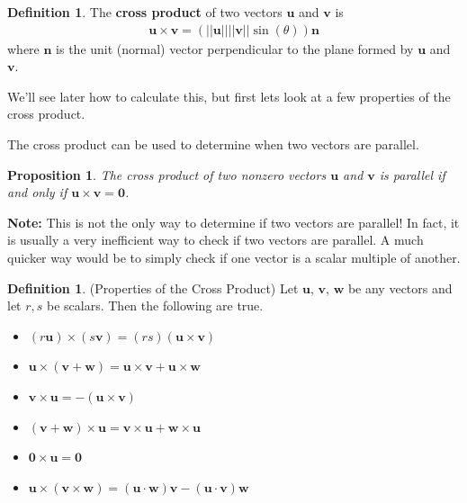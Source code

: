 \documentclass[12pt, letter]{article}
\theoremstyle{plain}
\newtheorem{proposition}[theorem]{Proposition}
\numberwithin{theorem}{section}
\theoremstyle{definition}
\newtheorem{definition}[theorem]{Definition}
\begin{document}
\bigskip

\begin{definition}
The \textbf{cross product} of two vectors $\bm{u}$ and $\bm{v}$ is
\begin{align*}
\bm{u} \times \bm{v} = (||\bm{u}|| ||\bm{v}|| \sin(\theta)) \bm{n}
\end{align*}
where $\bm{n}$ is the unit (normal) vector perpendicular to the plane formed by $\bm{u}$ and $\bm{v}$.
\end{definition}

\bigskip

We'll see later how to calculate this, but first lets look at a few properties of the cross product.

\bigskip

\hrulefill

\bigskip

The cross product can be used to determine when two vectors are parallel. 

\begin{proposition}
The cross product of two nonzero vectors $\bm{u}$ and $\bm{v}$ is parallel if and only if $\bm{u} \times \bm{v} = \bm{0}$.
\end{proposition}

\bigskip

\textbf{Note:} This is not the only way to determine if two vectors are parallel! In fact, it is usually a very inefficient way to check if two vectors are parallel. A much quicker way would be to simply check if one vector is a scalar multiple of another.

\bigskip

\hrulefill

\bigskip

\begin{definition}{(Properties of the Cross Product)}
Let $\bm{u}$, $\bm{v}$, $\bm{w}$ be any vectors and let $r, s$ be scalars. Then the following are true.
\begin{itemize}
\item $(r\bm{u}) \times (s\bm{v}) = (rs)(\bm{u}\times\bm{v})$
\item $\bm{u} \times (\bm{v}+\bm{w}) = \bm{u} \times \bm{v} + \bm{u} \times \bm{w}$
\item $\bm{v} \times \bm{u} = -(\bm{u} \times \bm{v})$
\item $(\bm{v}+\bm{w}) \times \bm{u} = \bm{v} \times \bm{u} + \bm{w} \times \bm{u}$
\item $\bm{0} \times \bm{u} = \bm{0}$
\item $\bm{u} \times (\bm{v} \times \bm{w}) = (\bm{u} \cdot \bm{w})\bm{v} - (\bm{u}\cdot\bm{v})\bm{w}$
\end{itemize}
\end{definition}
\end{document}
